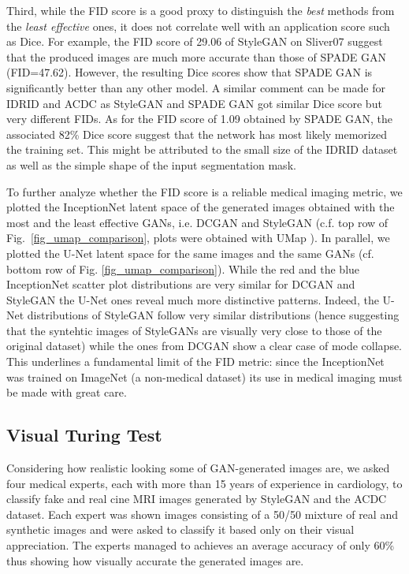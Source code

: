 \documentclass[preprint,12pt, authoryear]{elsarticle}
\begin{document}
Third, while the FID score is a good proxy to distinguish the {\em best} methods from the {\em least effective} ones, it does not correlate well with an application score such as Dice.  For example, the FID score of 29.06 of StyleGAN on Sliver07 suggest that the produced images are much more accurate than those of SPADE GAN (FID=47.62).  However, the resulting Dice scores show that SPADE GAN is significantly better than any other model.  A similar comment can be made for IDRID and ACDC as StyleGAN and SPADE GAN got similar Dice score but very different FIDs.
 As for the FID score of 1.09 obtained by SPADE GAN, the associated 82\%  Dice score suggest that the network has most likely memorized the training set. This might be attributed to the small size of the IDRID dataset as well as the simple shape of the input segmentation mask.



To further analyze whether the FID score is a reliable medical imaging metric, we plotted the InceptionNet latent space of the  generated images obtained with the most and the least effective GANs, i.e. DCGAN and StyleGAN (c.f. top row of Fig.~\ref{fig_umap_comparison}, plots were obtained with UMap \citep{McInnes2018UMAPUM}).  
In parallel, we plotted the U-Net latent space for the same images and the same GANs (cf. bottom row of Fig. \ref{fig_umap_comparison}). While the red and the blue InceptionNet scatter plot distributions are very similar for DCGAN and StyleGAN the U-Net ones reveal much more distinctive patterns.  Indeed, the U-Net distributions of  StyleGAN follow very similar distributions (hence suggesting that the syntehtic images of StyleGANs are visually very close to those of the original dataset) while the ones from DCGAN show a clear case of mode collapse.  This underlines a fundamental limit of the FID metric: since the InceptionNet was trained on ImageNet (a non-medical dataset) its use in medical imaging must be made with great care.

\subsection{Visual Turing Test}
Considering how realistic looking some of GAN-generated images are, we asked four medical experts, each with more than 15 years of experience in cardiology, to classify fake and real cine MRI images generated by StyleGAN and the ACDC dataset.  Each expert was shown  images consisting of a 50/50 mixture of real and synthetic images and were asked to classify it based only on their visual appreciation.  The experts managed to achieves an average accuracy of only 60\% thus showing how visually accurate the generated images are.
\end{document}
